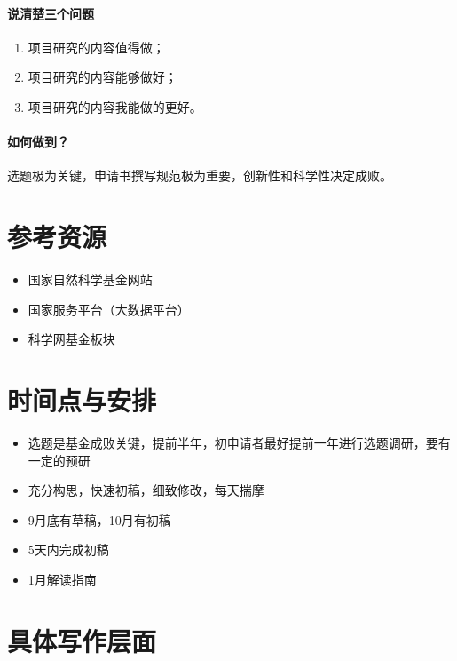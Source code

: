 \paragraph{说清楚三个问题}
\begin{enumerate}
\item 项目研究的内容值得做；
\item 项目研究的内容能够做好； 
\item 项目研究的内容我能做的更好。
\end{enumerate}

\paragraph{如何做到？}
选题极为关键，申请书撰写规范极为重要，创新性和科学性决定成败。


\section{参考资源}
\begin{itemize}
\item 国家自然科学基金网站
\item 国家服务平台（大数据平台）
\item 科学网基金板块
\end{itemize}


\section{时间点与安排}
\begin{itemize}
\item 选题是基金成败关键，提前半年，初申请者最好提前一年进行选题调研，要有一定的预研
\item 充分构思，快速初稿，细致修改，每天揣摩
\item 9月底有草稿，10月有初稿
\item 5天内完成初稿
\item 1月解读指南
\end{itemize}



\section{具体写作层面}
